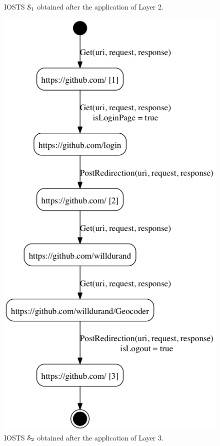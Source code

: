 \begin{figure}[H]
\begin{minipage}{.5\textwidth}
    \caption{IOSTS $\EuScript{S}_1$ obtained after the
    application of Layer 2.}
    \label{fig:github:iosts:1}
\end{minipage}
\begin{minipage}{.5\textwidth}
    \includegraphics[width=1.0\linewidth]{figures/gh-iosts-2.png}

    \caption{IOSTS $\EuScript{S}_2$ obtained after the
    application of Layer 3.}
    \label{fig:github:iosts:2}
\end{minipage}
\end{figure}

